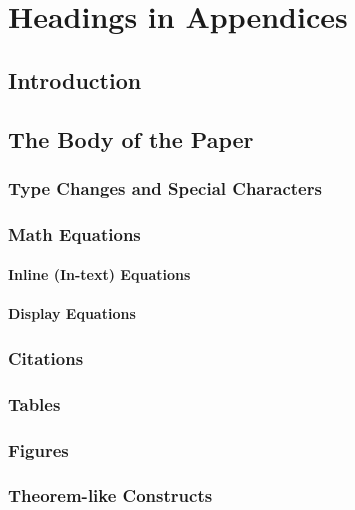 \documentclass{acm_proc_article-sp}
\begin{document}

%
%
\appendix
\section{Headings in Appendices}
\subsection{Introduction}
\subsection{The Body of the Paper}
\subsubsection{Type Changes and  Special Characters}
\subsubsection{Math Equations}
\paragraph{Inline (In-text) Equations}
\paragraph{Display Equations}
\subsubsection{Citations}
\subsubsection{Tables}
\subsubsection{Figures}
\subsubsection{Theorem-like Constructs}
\end{document}

